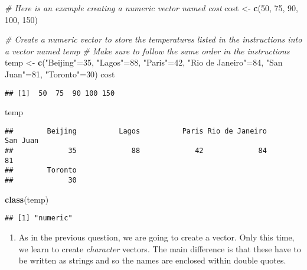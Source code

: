 \documentclass[
]{article}
\newenvironment{Shaded}{\begin{snugshade}}{\end{snugshade}}
\newcommand{\CommentTok}[1]{\textcolor[rgb]{0.56,0.35,0.01}{\textit{#1}}}
\newcommand{\DecValTok}[1]{\textcolor[rgb]{0.00,0.00,0.81}{#1}}
\newcommand{\KeywordTok}[1]{\textcolor[rgb]{0.13,0.29,0.53}{\textbf{#1}}}
\newcommand{\NormalTok}[1]{#1}
\newcommand{\StringTok}[1]{\textcolor[rgb]{0.31,0.60,0.02}{#1}}
\providecommand{\tightlist}{%
  \setlength{\itemsep}{0pt}\setlength{\parskip}{0pt}}
\begin{document}
\begin{Shaded}
\begin{Highlighting}[]
\CommentTok{# Here is an example creating a numeric vector named cost}
\NormalTok{cost <-}\StringTok{ }\KeywordTok{c}\NormalTok{(}\DecValTok{50}\NormalTok{, }\DecValTok{75}\NormalTok{, }\DecValTok{90}\NormalTok{, }\DecValTok{100}\NormalTok{, }\DecValTok{150}\NormalTok{)}

\CommentTok{# Create a numeric vector to store the temperatures listed in the instructions into a vector named temp}
\CommentTok{# Make sure to follow the same order in the instructions}
\NormalTok{temp <-}\StringTok{ }\KeywordTok{c}\NormalTok{(}\StringTok{"Beijing"}\NormalTok{=}\DecValTok{35}\NormalTok{, }\StringTok{"Lagos"}\NormalTok{=}\DecValTok{88}\NormalTok{, }\StringTok{"Paris"}\NormalTok{=}\DecValTok{42}\NormalTok{, }\StringTok{"Rio de Janeiro"}\NormalTok{=}\DecValTok{84}\NormalTok{, }\StringTok{"San Juan"}\NormalTok{=}\DecValTok{81}\NormalTok{, }\StringTok{"Toronto"}\NormalTok{=}\DecValTok{30}\NormalTok{)}
\NormalTok{cost}
\end{Highlighting}
\end{Shaded}

\begin{verbatim}
## [1]  50  75  90 100 150
\end{verbatim}

\begin{Shaded}
\begin{Highlighting}[]
\NormalTok{temp}
\end{Highlighting}
\end{Shaded}

\begin{verbatim}
##        Beijing          Lagos          Paris Rio de Janeiro       San Juan 
##             35             88             42             84             81 
##        Toronto 
##             30
\end{verbatim}

\begin{Shaded}
\begin{Highlighting}[]
\KeywordTok{class}\NormalTok{(temp)}
\end{Highlighting}
\end{Shaded}

\begin{verbatim}
## [1] "numeric"
\end{verbatim}

\begin{enumerate}
\def\labelenumi{\arabic{enumi}.}
\setcounter{enumi}{1}
\tightlist
\item
  As in the previous question, we are going to create a vector. Only
  this time, we learn to create \emph{character} vectors. The main
  difference is that these have to be written as strings and so the
  names are enclosed within double quotes.
\end{enumerate}
\end{document}
